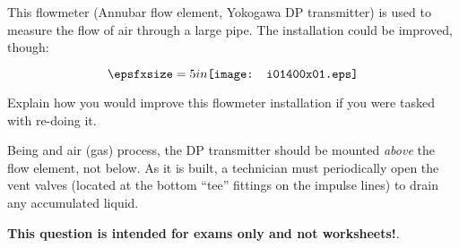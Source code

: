 

This flowmeter (Annubar flow element, Yokogawa DP transmitter) is used to measure the flow of air through a large pipe.  The installation could be improved, though:

$$\epsfxsize=5in \texttt{[image: i01400x01.eps]}$$

Explain how you would improve this flowmeter installation if you were tasked with re-doing it.







Being and air (gas) process, the DP transmitter should be mounted {\it above} the flow element, not below.  As it is built, a technician must periodically open the vent valves (located at the bottom ``tee'' fittings on the impulse lines) to drain any accumulated liquid.







{\bf This question is intended for exams only and not worksheets!}.



